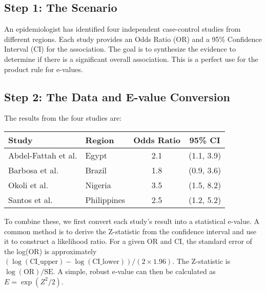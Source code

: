 \documentclass[11pt]{article}
\begin{document}
\subsection*{Step 1: The Scenario}
An epidemiologist has identified four independent case-control studies from different regions. Each study provides an Odds Ratio (OR) and a 95\% Confidence Interval (CI) for the association. The goal is to synthesize the evidence to determine if there is a significant overall association. This is a perfect use for the product rule for e-values.

\subsection*{Step 2: The Data and E-value Conversion}
The results from the four studies are:
\begin{center}
\begin{tabular}{llcc}
\toprule
\textbf{Study} & \textbf{Region} & \textbf{Odds Ratio} & \textbf{95\% CI} \\
\midrule
Abdel-Fattah et al. & Egypt & 2.1 & (1.1, 3.9) \\
Barbosa et al. & Brazil & 1.8 & (0.9, 3.6) \\
Okoli et al. & Nigeria & 3.5 & (1.5, 8.2) \\
Santos et al. & Philippines & 2.5 & (1.2, 5.2) \\
\bottomrule
\end{tabular}
\end{center}
To combine these, we first convert each study's result into a statistical e-value. A common method is to derive the Z-statistic from the confidence interval and use it to construct a likelihood ratio. For a given OR and CI, the standard error of the log(OR) is approximately $(\log(\text{CI\_upper}) - \log(\text{CI\_lower})) / (2 \times 1.96)$. The Z-statistic is $\log(\text{OR}) / \text{SE}$. A simple, robust e-value can then be calculated as $E = \exp(Z^2 / 2)$.
\end{document}
